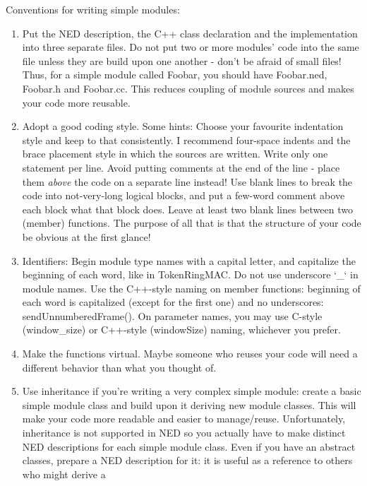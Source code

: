 Conventions for writing simple modules:
\begin{enumerate}
\item{Put the NED description, the C++ class declaration and the
    implementation into three separate files. Do not put two or more
    modules' code into the same file unless they are build upon one
    another - don't be afraid of small files! Thus, for a
    simple module called Foobar, you should have
    Foobar.ned, Foobar.h and Foobar.cc. This reduces coupling of
    module sources and makes your code more reusable.}
\item{Adopt a good coding style. Some hints: Choose your favourite
    indentation style and keep to that consistently. I recommend
    four-space indents and the brace placement style in which the
    {\opp} sources are written. Write only one statement per line.
    Avoid putting comments at the end of the line - place them
    \textit{above} the code on a separate line instead! Use blank
    lines to break the code into not-very-long logical blocks, and put
    a few-word comment above each block what that block does. Leave at
    least two blank lines between two (member) functions. The purpose
    of all that is that the structure of your code be obvious at the
    first glance!}
\item{Identifiers: Begin module type names with a capital letter, and
    capitalize the beginning of each word, like in TokenRingMAC.  Do
    not use underscore `\_` in module names. Use the C++-style naming
    on member functions: beginning of each word is capitalized (except
    for the first one) and no underscores: sendUnnumberedFrame().  On
    parameter names, you may use C-style (window\_size) or C++-style
    (windowSize) naming, whichever you prefer.}
\item{Make the functions virtual. Maybe someone who reuses your code
    will need a different behavior than what you thought of.}
\item{Use inheritance if you're writing a very complex
    simple module: create a basic
    simple module class and build upon it
    deriving new module classes. This will make your code more
    readable and easier to manage/reuse. Unfortunately, inheritance is
    not supported in NED so you actually have to make distinct NED
    descriptions for each simple module class.
    Even if you have an abstract classes, prepare a NED description
    for it: it is useful as a reference to others who might derive a
}
\end{enumerate}
